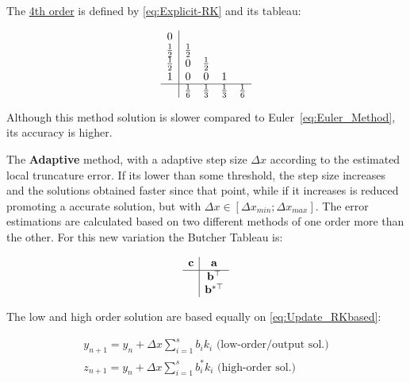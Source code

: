 The \underline{ 4th order} is defined by \ref{eq:Explicit-RK} and its tableau:

\begin{equation}
    \begin{array}{c|cccc}
        0\\
        \frac{1}{2} & \frac{1}{2}\\
        \frac{1}{2} & 0 & \frac{1}{2} \\
        1 & 0 & 0 & 1\\
        \hline
        & \frac{1}{6} & \frac{1}{3} & \frac{1}{3} & \frac{1}{6}  
    \end{array}
    \label{eq:RK4_Tableu}
\end{equation}

Although this method solution is slower compared to Euler~\ref{eq:Euler_Method}, its accuracy is higher. \par
The \textbf{Adaptive } \label{subsubsub:RK_Adaptive} method, with a adaptive step size \(\Delta x\) according to the estimated local truncature error. If its lower than some threshold, the step size increases and the solutions obtained faster since that point, while if it increases is reduced promoting a accurate solution, but with \(\Delta x \in [\Delta x_{min}; \Delta x_{max}]\).  The error estimations are calculated based on two different methods of one order more than the other. For this new  variation the Butcher Tableau is:

\begin{equation} 
    \begin{array}{c|c}
        \mathbf{c} & \mathbf{a} \\
        \hline
        & \mathbf{b}^\top  \\
        & \mathbf{b}^{*\top }
    \end{array}
    \label{eq:Explicit_Butcher_Tableu}
\end{equation}


The low and high order solution are based equally on \ref{eq:Update_RKbased}:

\begin{subequations}
    \begin{align}
        y_{n+1} = y_n + \Delta x \sum^{s}_{i=1}b_i k_i \text{  (low-order/output sol.)} \label{eq:Update_Output_adaptiveRK} \\
        z_{n+1} = y_n + \Delta x \sum^{s}_{i=1}b^*_i k_i \text{  (high-order sol.)} \label{eq:Update_HighOrder_adaptiveRK} 
    \end{align}
    \label{eq:Update_Adaptive-RK}  
\end{subequations}

